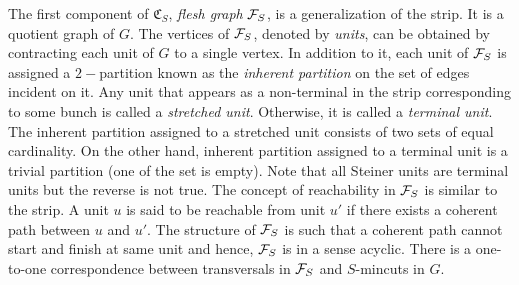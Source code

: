 The first component of ${\mathfrak C}_S$, \textit{flesh graph} ${\cal F}_S$, is a generalization of the strip. It is a quotient graph of $G$. The vertices of ${\cal F}_S$, denoted by {\em units}, can be obtained by contracting each unit of $G$ to a single vertex. In addition to it, each unit of ${\cal F}_S$ is assigned a $2-$partition known as the \textit{inherent partition} on the set of edges incident on it. Any unit that appears as a non-terminal in the strip corresponding to some bunch is called a \textit{stretched unit}. Otherwise, it is called a \textit{terminal unit}. 
The inherent partition assigned to a stretched unit consists of two sets of equal cardinality. On the other hand, inherent partition assigned to a terminal unit is a trivial partition (one of the set is empty). Note that all Steiner units are terminal units but the reverse is not true.
The concept of reachability in ${\cal F}_S$ is similar to the strip. A unit $u$ is said to be reachable from unit $u'$ if there exists a coherent path between $u$ and $u'$. The structure of ${\cal F}_S$ is such that a coherent path cannot start and finish at same unit and hence, ${\cal F}_S$ is in a sense acyclic. There is a one-to-one correspondence between transversals in ${\cal F}_S$ and $S$-mincuts in $G$.

